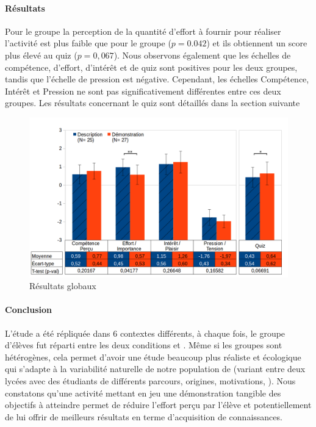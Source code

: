         \paragraph{Résultats}
            Pour le groupe  la perception de la quantité d'effort à fournir pour réaliser l'activité est plus faible que pour le groupe  ($p=0.042$) et ils obtiennent un score plus élevé au quiz ($p=0,067$). Nous observons également que les échelles de compétence, d’effort, d’intérêt et de quiz sont positives pour les deux groupes, tandis que l’échelle de pression est négative. Cependant, les échelles Compétence, Intérêt et Pression ne sont pas significativement différentes entre ces deux groupes.
            Les résultats concernant le quiz sont détaillés dans la section suivante~
            \begin{figure}[!h]
                \centering
                \includegraphics[width=0.9\linewidth]{Figures/Desprez-result_poule.png}
                \caption{Résultats globaux }\label{fig:result_poule}
            \end{figure}
        \paragraph{Conclusion}  
            L’étude a été répliquée dans 6 contextes différents, à chaque fois, le groupe d'élèves fut réparti entre les deux conditions  et . Même si les groupes sont hétérogènes, cela permet d’avoir une étude beaucoup plus réaliste et écologique qui s’adapte à la variabilité naturelle de notre population de  (variant entre deux lycées avec des étudiants de différents parcours, origines, motivations, \etc). Nous constatons qu'une activité mettant en jeu une démonstration tangible des objectifs à atteindre permet de réduire l'effort perçu par l'élève et potentiellement de lui offrir de meilleurs résultats en terme d'acquisition de connaissances.
